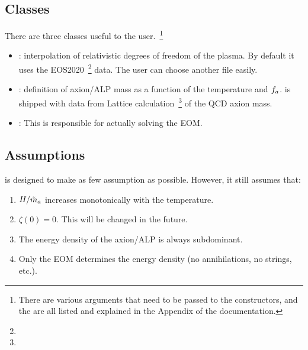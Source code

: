 \documentclass[10pt,utf8,compress,xcolor=dvipsnames]{beamer}
\begin{document}
\subsection{Classes}
\begin{frame}[fragile]{\insertsubsectionhead}
	There are three classes useful to the user.~\footnote{\fontF There are various arguments that need to be passed to the constructors, and the are all listed and explained in the Appendix of the documentation.}
	\begin{itemize}
	\item {}: interpolation of relativistic degrees of freedom of the plasma. By default it uses the EOS2020~\footnote{\fontF 
	} data. The user can choose another file easily.
	\pause
	\item {}: definition of axion/ALP mass as a function of the temperature and $f_{a}{}$. \mimes is shipped with data from Lattice calculation~\footnote{\fontF {}} of the QCD axion mass.
	 \pause
	\item {}: This is responsible for actually solving the EOM.
	\end{itemize}
	
	
\end{frame}

\subsection{Assumptions}
\begin{frame}[fragile]{\insertsubsectionhead}
	
	\mimes is designed to make as few assumption as possible. However, it still assumes that:\pause
	\begin{enumerate}
		\item $H/\tilde m_{a}{}$ increases monotonically with the temperature.\pause
		\item $\zeta(0)=0$. This will be changed in the future.\pause
		\item The energy density of the axion/ALP is always subdominant.\pause
		\item Only the EOM determines the energy density (no annihilations, no strings, etc.).
	\end{enumerate}
	
	
\end{frame}
\end{document}
